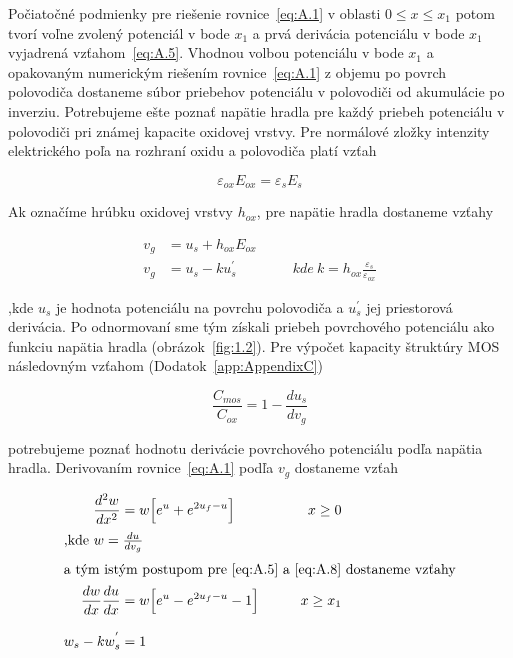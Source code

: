  Počiatočné podmienky pre riešenie rovnice~\ref{eq:A.1} v oblasti
 ${0\leq{x}\leq{x_1}}$ potom tvorí voľne zvolený potenciál v bode
 $x_1$ a prvá derivácia potenciálu v bode $x_1$ vyjadrená
 vzťahom~\ref{eq:A.5}. Vhodnou volbou potenciálu v bode $x_1$ a
 opakovaným numerickým riešením rovnice~\ref{eq:A.1} z objemu po
 povrch polovodiča dostaneme súbor priebehov potenciálu v polovodiči
 od akumulácie po inverziu. Potrebujeme ešte poznať napätie hradla pre
 každý priebeh potenciálu v polovodiči pri známej kapacite oxidovej
 vrstvy.  Pre normálové zložky intenzity elektrického poľa na rozhraní
 oxidu a polovodiča platí vzťah

\begin{equation}\label{eq:A.6}
  \varepsilon_{ox}E_{ox} = \varepsilon_s{E_s}
\end{equation}

Ak označíme hrúbku oxidovej vrstvy $h_{ox}$, pre napätie hradla
dostaneme vzťahy

\begin{align}
  v_g &= u_s + h_{ox}E_{ox} \label{eq:A.7} \\
  v_g &= u_s - ku_{s}^{'} \qquad\qquad kde\ {k = h_{ox}\frac{\varepsilon_s}{\varepsilon_{ox}}} \label{eq:A.8}
\end{align}

,kde $u_s$ je hodnota potenciálu na povrchu polovodiča a $u_{s}^{'}$
jej priestorová derivácia. Po odnormovaní sme tým získali priebeh
povrchového potenciálu ako funkciu napätia hradla
(obrázok~\ref{fig:1.2}). Pre výpočet kapacity štruktúry MOS
následovným vzťahom (Dodatok~\ref{app:AppendixC})

\begin{equation}\label{eq:A.9}
  \frac{C_{mos}}{C_{ox}} = 1 - \frac{du_s}{dv_g}
\end{equation}

potrebujeme poznať hodnotu derivácie povrchového potenciálu podľa
napätia hradla. Derivovaním rovnice~\ref{eq:A.1} podľa $v_g$ dostaneme
vzťah

\begin{samepage}
\begin{subequations}\label{eq:A.10}
  \begin{align}
    \frac{d^{2}w}{dx^2} &= w \Big[e^u + e^{2u_f-u}\Big] \qquad &{x\ge{0}} \label{eq:A.10a} \\
    \intertext{,kde $w=\frac{du}{dv_g}$}
    \intertext{a tým istým postupom pre~\ref{eq:A.5} a~\ref{eq:A.8} dostaneme vzťahy}
    \frac{dw}{dx}\frac{du}{dx} &= w \Big[e^u - e^{2u_f-u} - 1\Big] \qquad &{x\ge{x_1}} \label{eq:A.10b} \\[0.3cm]
    w_s - kw_s^{'} &= 1 \label{eq:A.10c}
  \end{align}
\end{subequations}
\end{samepage}

